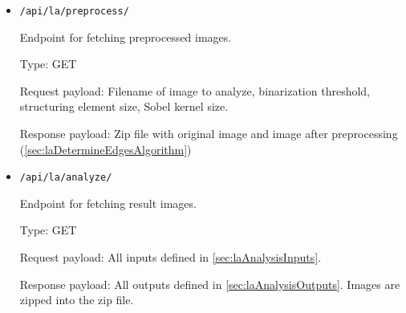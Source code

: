 \begin{itemize}
    \item \verb|/api/la/preprocess/|

    Endpoint for fetching preprocessed images.

    Type: GET
    
    Request payload: Filename of image to analyze, binarization threshold, structuring element size, Sobel kernel size.
    
    Response payload: Zip file with original image and image after preprocessing (\autoref{sec:laDetermineEdgesAlgorithm})
    
    \item \verb|/api/la/analyze/|
    
    Endpoint for fetching result images.

    Type: GET
    
    Request payload: All inputs defined in \autoref{sec:laAnalysisInputs}.
    
    Response payload: All outputs defined in \autoref{sec:laAnalysisOutputs}. Images are zipped into the zip file.
    
\end{itemize}